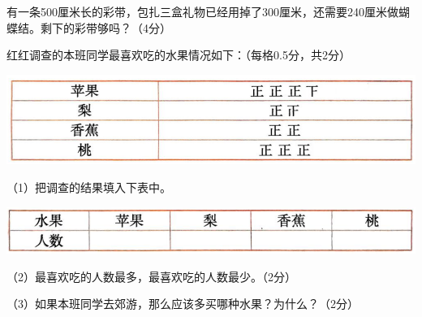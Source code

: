 \documentclass[12pt]{exam-zh}
\begin{document}
\begin{problem}[index=5]
    有一条500厘米长的彩带，包扎三盒礼物已经用掉了300厘米，还需要240厘米做蝴蝶结。剩下的彩带够吗？（4分）
\end{problem}
\vspace{2.5cm} %

\begin{problem}[index=6]
红红调查的本班同学最喜欢吃的水果情况如下：（每格0.5分，共2分）

\includegraphics[scale=0.4]{12.png}

（1）把调查的结果填入下表中。

\includegraphics[scale=0.4]{13.png}

（2）最喜欢吃\fillin[width=3em][]的人数最多，最喜欢吃\fillin[width=3em][]的人数最少。（2分）

（3）如果本班同学去郊游，那么应该多买哪种水果？为什么？（2分）
\end{problem}
\end{document}
